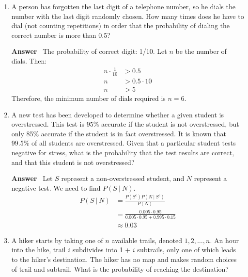 \documentclass[paper=usletter, fontsize=12pt]{article}
\newcommand{\ans}{\textbf{Answer} \ }
\newcommand\given[1][]{\:#1\vert\:}
\begin{document}
\begin{enumerate}
        \item A person has forgotten the last digit of a telephone number, so
        he dials the number with the last digit randomly chosen. How many times
        does he have to dial (not counting repetitions) in order that the
        probability of dialing the correct number is more than 0.5?

        \ans The probability of correct digit: 1/10. Let $n$ be the number of
        dials. Then:
        \begin{align*}
            n \cdot \frac{1}{10} & > 0.5 \\
            n & > 0.5 \cdot 10 \\
            n & > 5
        \end{align*}
        Therefore, the minimum number of dials required is $n=6$.

        \item A new test has been developed to determine whether a given
        student is overstressed. This test is 95\% accurate if the student is
        not overstressed, but only 85\% accurate if the student is in fact
        overstressed. It is known that 99.5\% of all students are overstressed.
        Given that a particular student tests negative for stress, what is the
        probability that the test results are correct, and that this student is
        not overstressed?

        \ans Let $S$ represent a non-overstressed student, and $N$ represent a
        negative test. We need to find $P(S \given N)$.
        \begin{align*}
            P(S \given N) & = \frac{P(S^c)P(N \given S^c)}{P(N)} \\
            & = \frac{0.005 \cdot 0.95}{0.005 \cdot 0.95 + 0.995 \cdot 0.15 }\\
            & \approx 0.03
        \end{align*}

        \item A hiker starts by taking one of $n$ available trails, denoted $1,
        2, \ldots, n$. An hour into the hike, trail $i$ subdivides into 1 +
        $i$ subtrails, only one of which leads to the hiker’s destination. The
        hiker has no map and makes random choices of trail and subtrail. What
        is the probability of reaching the destination?


\end{enumerate}
\end{document}
